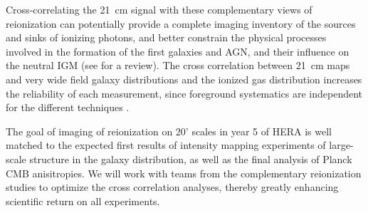 \documentclass[preprint]{aastex}
\begin{document}
Cross-correlating
the 21~cm signal with these complementary views of reionization
can potentially provide a complete imaging inventory of the sources and sinks of
ionizing photons, and better constrain the physical processes involved in the
formation of the first galaxies and AGN, and their influence on the neutral IGM
(see \citealt{pritchard_loeb2012} for a review).  
The cross correlation between 21~cm maps and very wide field galaxy distributions and the
ionized gas distribution increases the reliability
of each measurement,
since foreground systematics are independent for the different
techniques \citep{gong_et_al2011,alvarez_et_al2006,tashiro_et_al2010}. 

The goal of imaging of
reionization on 20' scales in year
5 of HERA is well matched to the expected first results of intensity
mapping experiments of large-scale structure in the galaxy distribution, as
well as the final analysis of Planck CMB anisitropies. 
We will work with teams from the complementary
reionization studies to optimize the cross correlation analyses, thereby
greatly enhancing scientific return on all experiments. 

%
%
%
%
%
%
%
\end{document}
